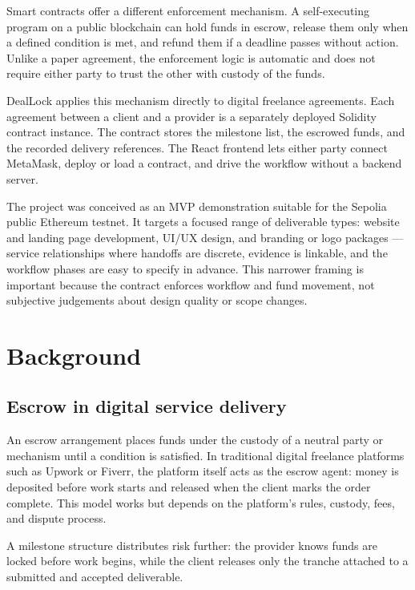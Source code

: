 \documentclass[12pt,a4paper]{article}
\begin{document}
Smart contracts offer a different enforcement mechanism.
A self-executing program on a public blockchain can hold funds in escrow, release
them only when a defined condition is met, and refund them if a deadline passes
without action.
Unlike a paper agreement, the enforcement logic is automatic and does not require
either party to trust the other with custody of the funds.

DealLock applies this mechanism directly to digital freelance agreements.
Each agreement between a client and a provider is a separately deployed Solidity
contract instance.
The contract stores the milestone list, the escrowed funds, and the recorded
delivery references.
The React frontend lets either party connect MetaMask, deploy or load a contract,
and drive the workflow without a backend server.

The project was conceived as an MVP demonstration suitable for the Sepolia
public Ethereum testnet.
It targets a focused range of deliverable types: website and landing page
development, UI/UX design, and branding or logo packages --- service relationships
where handoffs are discrete, evidence is linkable, and the workflow phases are
easy to specify in advance.
This narrower framing is important because the contract enforces workflow and
fund movement, not subjective judgements about design quality or scope changes.

\newpage
\section{Background}
\label{sec:background}

\subsection{Escrow in digital service delivery}

An escrow arrangement places funds under the custody of a neutral party or
mechanism until a condition is satisfied.
In traditional digital freelance platforms such as Upwork or Fiverr, the platform
itself acts as the escrow agent: money is deposited before work starts and released
when the client marks the order complete.
This model works but depends on the platform's rules, custody, fees, and dispute
process.

A milestone structure distributes risk further: the provider knows funds are
locked before work begins, while the client releases only the tranche attached
to a submitted and accepted deliverable.
\end{document}
